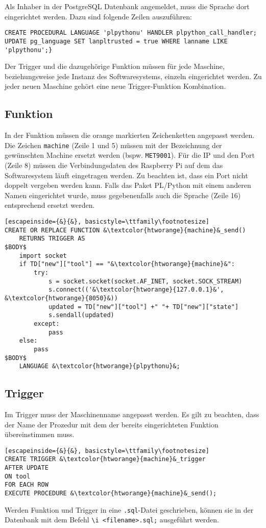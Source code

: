 \documentclass{scrartcl}
\begin{document}
Als Inhaber in der PostgreSQL Datenbank angemeldet, muss die Sprache dort eingerichtet werden. Dazu sind folgende Zeilen auszuführen:
\begin{lstlisting}[frame=none, numbers=none, basicstyle=\ttfamily\footnotesize]
CREATE PROCEDURAL LANGUAGE 'plpythonu' HANDLER plpython_call_handler;
UPDATE pg_language SET lanpltrusted = true WHERE lanname LIKE 'plpythonu';}
\end{lstlisting}

Der Trigger und die dazugehörige Funktion müssen für jede Maschine, beziehungsweise jede Instanz des Softwaresystems, einzeln eingerichtet werden. Zu jeder neuen Maschine gehört eine neue Trigger-Funktion Kombination.

\subsection{Funktion}

In der Funktion müssen die orange markierten Zeichenketten angepasst werden. Die Zeichen \lstinline`machine` (Zeile 1 und 5) müssen mit der Bezeichnung der gewünschten Machine ersetzt werden (bspw. \lstinline$MET9001$). Für die IP und den Port (Zeile 8) müssen die Verbindungsdaten des Raspberry Pi auf dem das Softwaresystem läuft eingetragen werden. Zu beachten ist, dass ein Port nicht doppelt vergeben werden kann. Falls das Paket PL/Python mit einem anderen Namen eingerichtet wurde, muss gegebenenfalls auch die Sprache (Zeile 16) entsprechend ersetzt werden.
\begin{lstlisting}[escapeinside={&}{&}, basicstyle=\ttfamily\footnotesize]
CREATE OR REPLACE FUNCTION &\textcolor{htworange}{machine}&_send()  
    RETURNS TRIGGER AS
$BODY$
    import socket
    if TD["new"]["tool"] == "&\textcolor{htworange}{machine}&": 
        try:
            s = socket.socket(socket.AF_INET, socket.SOCK_STREAM)
            s.connect(('&\textcolor{htworange}{127.0.0.1}&', &\textcolor{htworange}{8050}&)) 
            updated = TD["new"]["tool"] +" "+ TD["new"]["state"]
            s.sendall(updated)
        except:
            pass
    else:
        pass
$BODY$
    LANGUAGE &\textcolor{htworange}{plpythonu}&;
\end{lstlisting}
\subsection{Trigger}
Im Trigger muss der Maschinenname angepasst werden. Es gilt zu beachten, dass der Name der Prozedur mit dem der bereits eingerichteten Funktion übereinstimmen muss.
\begin{lstlisting}[escapeinside={&}{&}, basicstyle=\ttfamily\footnotesize]
CREATE TRIGGER &\textcolor{htworange}{machine}&_trigger
AFTER UPDATE
ON tool
FOR EACH ROW
EXECUTE PROCEDURE &\textcolor{htworange}{machine}&_send();
\end{lstlisting}

Werden Funktion und Trigger in eine \lstinline`.sql`-Datei geschrieben, können sie in der Datenbank mit dem Befehl \lstinline`\i <filename>.sql;` ausgeführt werden.
\end{document}
